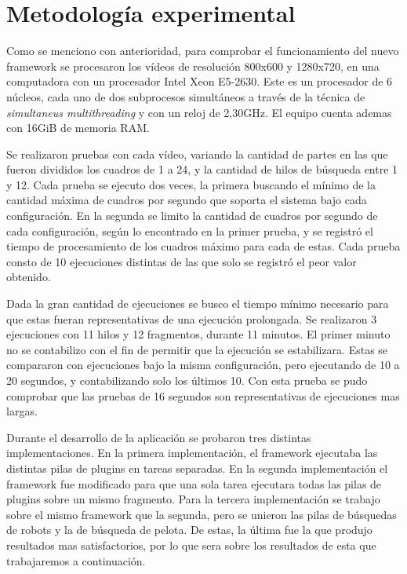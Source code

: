 
\section{Metodología experimental}

Como se menciono con anterioridad, para comprobar el funcionamiento del nuevo
framework se procesaron los vídeos de resolución 800x600 y 1280x720, en
una computadora con un procesador Intel Xeon E5-2630. Este es un procesador de 6
núcleos, cada uno de dos subprocesos simultáneos a través de la técnica de
\emph{simultaneus multithreading} y con un reloj de 2,30GHz. El equipo cuenta
ademas con 16GiB de memoria RAM.

Se realizaron pruebas con cada vídeo, variando la cantidad de partes en las que
fueron divididos los cuadros de 1 a 24, y la cantidad de hilos de búsqueda entre
1 y 12. Cada prueba se ejecuto dos veces, la primera buscando el mínimo de la
cantidad máxima de cuadros por segundo que soporta el sistema bajo cada
configuración. En la segunda se limito la cantidad de cuadros por segundo de
cada configuración, según lo encontrado en la primer prueba, y se registró el
tiempo de procesamiento de los cuadros máximo para cada de estas. Cada prueba
consto de 10 ejecuciones distintas de las que solo se registró el peor valor
obtenido.

Dada la gran cantidad de ejecuciones se busco el tiempo mínimo necesario para
que estas fueran representativas de una ejecución prolongada. Se realizaron 3
ejecuciones con 11 hilos y 12 fragmentos, durante 11 minutos. El primer minuto
no se contabilizo con el fin de permitir que la ejecución se estabilizara.
Estas se compararon con ejecuciones bajo la misma configuración, pero ejecutando
de 10 a 20 segundos, y contabilizando solo los últimos 10. Con esta prueba se
pudo comprobar que las pruebas de 16 segundos son representativas de ejecuciones
mas largas.

Durante el desarrollo de la aplicación se probaron tres distintas
implementaciones. En la primera implementación, el framework ejecutaba las
distintas pilas de plugins en tareas separadas. En la segunda implementación el
framework fue modificado para que una sola tarea ejecutara todas las pilas de
plugins sobre un mismo fragmento. Para la tercera implementación se trabajo
sobre el mismo framework que la segunda, pero se unieron las pilas de búsquedas
de robots y la de búsqueda de pelota. De estas, la última fue la que produjo
resultados mas satisfactorios, por lo que sera sobre los resultados de esta que
trabajaremos a continuación.

